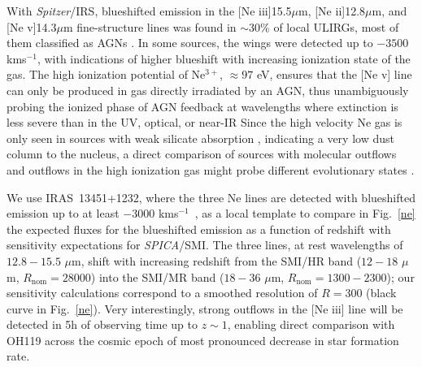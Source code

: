 \documentclass{pasa}%
\newcommand{\kms}{{\hbox {km\thinspace s$^{-1}$}}}
\begin{document}
With {\it Spitzer}/IRS, blueshifted emission in the [Ne {\sc iii}]15.5$\mu$m, 
[Ne {\sc ii}]12.8$\mu$m, and [Ne {\sc v}]14.3$\mu$m fine-structure lines
was found in $\sim30$\% of local ULIRGs, most of them classified as AGNs
\citep{spo09,spo09b}. In some sources, 
the wings were detected up to $-3500$ \kms, with indications of higher
blueshift with increasing ionization state of the gas. The high ionization
potential of Ne$^{3+}$, $\approx97$ eV, ensures that the [Ne {\sc v}] line
can only be produced in gas directly irradiated by an AGN, thus unambiguously
probing the ionized phase of AGN feedback at wavelengths where extinction is
less severe than in the UV, optical, or near-IR 
Since the high velocity Ne gas is only seen in sources with weak silicate
absorption \citep[the lower branch of the fork diagram in][]{spo07},
indicating a very low dust column to the nucleus, a direct 
comparison of sources with molecular outflows and outflows in the high
ionization gas might probe different evolutionary states \citep{spo13}.



We use IRAS~13451+1232, where the three Ne lines are detected with
blueshifted emission up to at least $-3000$ \kms\ \citep{spo09}, as a local
template to compare in Fig.~\ref{ne} the expected fluxes for the blueshifted
emission as a function of redshift 
with sensitivity expectations for {\it SPICA}/SMI.
The three lines, at rest wavelengths of $12.8-15.5$ $\mu$m, shift with
increasing redshift from the SMI/HR band ($12-18$ $\mu$m,
$R_{\mathrm{nom}}=28000$) into the SMI/MR band ($18-36$ $\mu$m,
$R_{\mathrm{nom}}=1300-2300$); our sensitivity calculations correspond to a
smoothed resolution of $R=300$ (black curve in Fig.~\ref{ne}). Very
interestingly, strong outflows in the [Ne {\sc iii}] line will be
detected in 5h of observing time up to $z\sim1$, enabling direct comparison
with OH119 across the cosmic epoch of most pronounced decrease in star
formation rate. 
\end{document}
